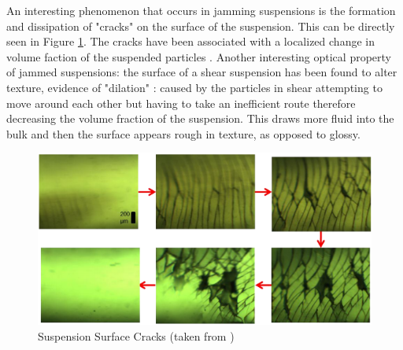 \documentclass[twoside,a4]{report}
\def\br{\newline \newline \noindent}
\def\cbh{\large\bfseries !!! ??? !!! \normalsize\normalfont}
\begin{document}
	An interesting phenomenon that occurs in jamming suspensions is the formation and dissipation of "cracks" on the surface of the suspension. This can be directly seen in Figure \ref{cforscracks}. The cracks have been associated with a localized change in volume faction of the suspended particles \cite{backhawjam}. Another interesting optical property of jammed suspensions: the surface of a shear suspension has been found to alter texture, evidence of "dilation" \cite{backbrownjaegrev}: caused by the particles in shear attempting to move around each other but having to take an inefficient route therefore decreasing the volume fraction of the suspension. This draws more fluid into the bulk and then the surface appears rough in texture, as opposed to glossy. 
	\begin{figure}[!htb]
		\centering
		\includegraphics[scale=0.4]{images/cfors_cracks.png}
		\caption{Suspension Surface Cracks (taken from \cite[p.~118]{thescforsyth})}
		\label{cforscracks}
	\end{figure}
\end{document}

